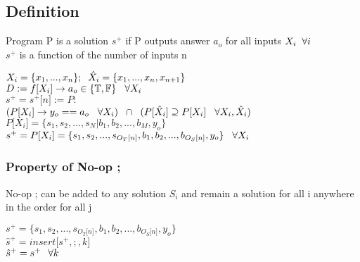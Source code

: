 \documentclass[11pt]{article}
\begin{document}
\subsection{Definition}
Program P is a solution $s^{+}$ if P outputs answer $a_o$ for all inputs $X_i \hspace{2mm} \forall i$\\
$s^+$ is a function of the number of inputs n
\begin{center}
\vspace{1mm}
$
X_i = \{x_1,...,x_n\}; \hspace{2mm} \hat{X}_i = \{x_1,...,x_n,x_{n+1}\}
$
\\ \vspace{2mm}
$
D := f \lbrack X_i \rbrack \rightarrow a_{o} \in \{\mathbb{T}, \mathbb{F}\} \hspace{3mm} \forall X_i
$
\\ \vspace{2mm}
$
s^+ = s^+\lbrack n \rbrack := P :
$
\\ \vspace{2mm}
$
(P \lbrack X_i \rbrack \rightarrow y_{o} == a_{o} \hspace{3mm} \forall X_i) \hspace{2mm} \cap \hspace{2mm} (P[\hat{X}_i] \supseteq P[X_i] \hspace{3mm} \forall X_i,\hat{X}_i)
$
\\ \vspace{2mm}
$
P \lbrack X_i \rbrack = \{ s_1,s_2,...,s_N| b_1, b_2,...,b_M,y_o\}
$
\\ \vspace{3mm}
$
s^+ = P \lbrack X_i \rbrack = \{ s_1,s_2,...,s_{O_T \lbrack n \rbrack }, b_1, b_2,...,b_{O_S \lbrack n \rbrack},y_o \} \hspace{3mm} \forall X_i
$
\end{center}





\subsubsection{Property of No-op ;}
No-op ; can be added to any solution $S_i$ and remain a solution for all i anywhere in the order for all j
\begin{center}
$
s^+ = \{ s_1,s_2,...,s_{O_T \lbrack n \rbrack }, b_1, b_2,...,b_{O_S \lbrack n \rbrack},y_o\}
$
\\ \vspace{2mm}
$
\hat{s}^+ = insert \lbrack s^+,;,k \rbrack
$
\\ \vspace{2mm}
$
\hat{s}^+ = s^+ \hspace{2.5mm} \forall k
$
\end{center}
\end{document}
